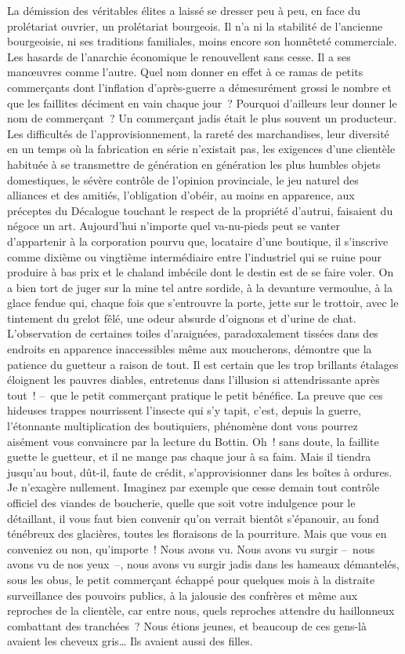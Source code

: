 \documentclass[french,twoside]{book} %
\begin{document}
\noindent La démission des véritables élites a laissé se dresser peu à peu, en face du prolétariat ouvrier, un prolétariat bourgeois. Il n’a ni la stabilité de l’ancienne bourgeoisie, ni ses traditions familiales, moins encore son honnêteté commerciale. Les hasards de l’anarchie économique le renouvellent sans cesse. Il a ses manœuvres comme l’autre. Quel nom donner en effet à ce ramas de petits commerçants dont l’inflation d’après-guerre a démesurément grossi le nombre et que les faillites déciment en vain chaque jour ? Pourquoi d’ailleurs leur donner le nom de commerçant ? Un commerçant jadis était le plus souvent un producteur. Les difficultés de l’approvisionnement, la rareté des marchandises, leur diversité en un temps où la fabrication en série n’existait pas, les exigences d’une clientèle habituée à se transmettre de génération en génération les plus humbles objets domestiques, le sévère contrôle de l’opinion provinciale, le jeu naturel des alliances et des amitiés, l’obligation d’obéir, au moins en apparence, aux préceptes du Décalogue touchant le respect de la propriété d’autrui, faisaient du négoce un art. Aujourd’hui n’importe quel va-nu-pieds peut se vanter d’appartenir à la corporation pourvu que, locataire d’une boutique, il s’inscrive comme dixième ou vingtième intermédiaire entre l’industriel qui se ruine pour produire à bas prix et le chaland imbécile dont le destin est de se faire voler. On a bien tort de juger sur la mine tel antre sordide, à la devanture vermoulue, à la glace fendue qui, chaque fois que s’entrouvre la porte, jette sur le trottoir, avec le tintement du grelot fêlé, une odeur absurde d’oignons et d’urine de chat. L’observation de certaines toiles d’araignées, paradoxalement tissées dans des endroits en apparence inaccessibles même aux moucherons, démontre que la patience du guetteur a raison de tout. Il est certain que les trop brillants étalages éloignent les pauvres diables, entretenus dans l’illusion si attendrissante après tout ! – que le petit commerçant pratique le petit bénéfice. La preuve que ces hideuses trappes nourrissent l’insecte qui s’y tapit, c’est, depuis la guerre, l’étonnante multiplication des boutiquiers, phénomène dont vous pourrez aisément vous convaincre par la lecture du Bottin. Oh ! sans doute, la faillite guette le guetteur, et il ne mange pas chaque jour à sa faim. Mais il tiendra jusqu’au bout, dût-il, faute de crédit, s’approvisionner dans les boîtes à ordures. Je n’exagère nullement. Imaginez par exemple que cesse demain tout contrôle officiel des viandes de boucherie, quelle que soit votre indulgence pour le détaillant, il vous faut bien convenir qu’on verrait bientôt s’épanouir, au fond ténébreux des glacières, toutes les floraisons de la pourriture. Mais que vous en conveniez ou non, qu’importe ! Nous avons vu. Nous avons vu surgir – nous avons vu de nos yeux –, nous avons vu surgir jadis dans les hameaux démantelés, sous les obus, le petit commerçant échappé pour quelques mois à la distraite surveillance des pouvoirs publics, à la jalousie des confrères et même aux reproches de la clientèle, car entre nous, quels reproches attendre du haillonneux combattant des tranchées ? Nous étions jeunes, et beaucoup de ces gens-là avaient les cheveux gris… Ils avaient aussi des filles.\par
\end{document}
